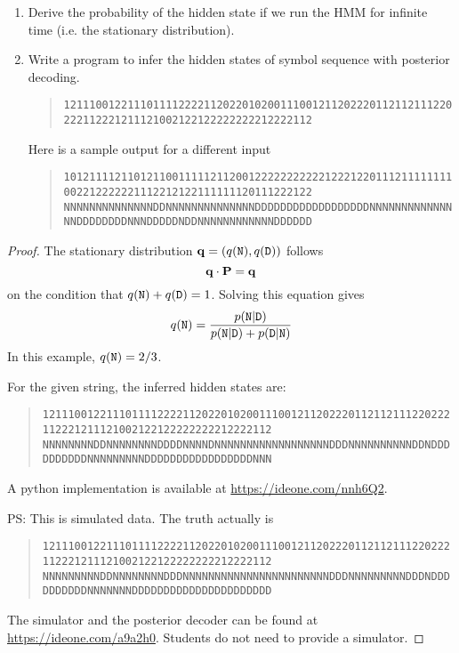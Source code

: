 \documentclass{article}[10pt]
\theoremstyle{definition}\newtheorem{question}{Question}
\begin{document}
\begin{enumerate}
\item Derive the probability of the hidden state if we run the HMM for infinite
time (i.e. the stationary distribution).
\item Write a program to infer the hidden states of symbol sequence with posterior decoding. 
\begin{quote}
\footnotesize\tt 1211100122111011112222112022010200111001211202220112112111220222112221211121002122122222222212222112\\
\end{quote}

Here is a sample output for a different input
\begin{quote}
\footnotesize\tt 1012111121101211001111121120012222222222212221220111211111111002212222221112212122111111120111222122
\footnotesize\tt NNNNNNNNNNNNNNDDNNNNNNNNNNNNNNDDDDDDDDDDDDDDDDDDNNNNNNNNNNNNNNNDDDDDDDDNNNDDDDDNDDNNNNNNNNNNNNDDDDDD
\end{quote}
\end{enumerate}

\begin{proof}
The stationary distribution ${\bf q}=(q({\tt N}),q({\tt D}))$ follows
$$
{\bf q}\cdot{\bf P}={\bf q}
$$
on the condition that $q({\tt N})+q({\tt D})=1$. Solving this equation gives
$$
q({\tt N})=\frac{p({\tt N}|{\tt D})}{p({\tt N}|{\tt D}) + p({\tt D}|{\tt N})}
$$
In this example, $q({\tt N})=2/3$.

For the given string, the inferred hidden states are:
\begin{quote}
\footnotesize\tt 1211100122111011112222112022010200111001211202220112112111220222112221211121002122122222222212222112\\
\footnotesize\tt NNNNNNNNDDNNNNNNNNDDDDNNNNDNNNNNNNNNNNNNNNNNNDDDNNNNNNNNNNDDNDDDDDDDDDDNNNNNNNNNDDDDDDDDDDDDDDDDDNNN
\end{quote}
A python implementation is available at \href{https://ideone.com/nnh6Q2}{https://ideone.com/nnh6Q2}.

\begin{flushleft}
PS: This is simulated data. The truth actually is
\end{flushleft}
\begin{quote}
\footnotesize\tt 1211100122111011112222112022010200111001211202220112112111220222112221211121002122122222222212222112\\
\footnotesize\tt NNNNNNNNNDDNNNNNNNNDDDNNNNNNNNNNNNNNNNNNNNNNNDDDNNNNNNNNNDDDNDDDDDDDDDDNNNNNNNDDDDDDDDDDDDDDDDDDDDDD
\end{quote}

The simulator and the posterior decoder can be found at
\href{https://ideone.com/a9a2h0}{https://ideone.com/a9a2h0}. Students do not
need to provide a simulator.

\end{proof}
\end{document}
